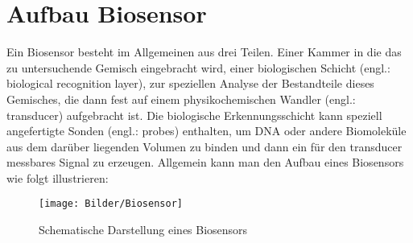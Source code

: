 
\section{Aufbau Biosensor}
Ein Biosensor besteht im Allgemeinen aus drei Teilen. Einer Kammer in die das zu untersuchende Gemisch eingebracht wird, einer biologischen Schicht (engl.: biological recognition layer), zur speziellen Analyse der Bestandteile dieses Gemisches, die dann fest auf einem physikochemischen Wandler (engl.: transducer) aufgebracht ist.\cite{AfullyintegratedCMOSfluorescencebiochip} Die biologische Erkennungsschicht kann speziell angefertigte Sonden (engl.: probes) enthalten, um DNA oder andere Biomoleküle aus dem darüber liegenden Volumen zu binden und dann ein für den transducer messbares Signal zu erzeugen.
Allgemein kann man den Aufbau eines Biosensors wie folgt illustrieren:
\begin{figure}[h]
	\texttt{[image: Bilder/Biosensor]}
	\caption[justification=raggedright]{Schematische Darstellung eines Biosensors}
\end{figure}

